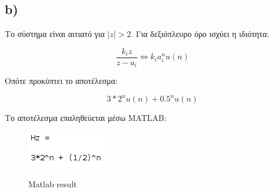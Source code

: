 \documentclass[11pt]{article}
\begin{document}
\subsection*{b)}
Το σύστημα είναι αιτιατό για $|z| > 2$.
Για δεξιόπλευρο όρο ισχύει η ιδιότητα:

\[
       \frac{k_i z}{z-a_i} \Leftrightarrow k_i a_i^n u(n)
\] 

\par \noindent
Οπότε προκύπτει το αποτέλεσμα:

\[
    3 * 2^n u(n) + 0.5^n u(n)
\] 

\par \noindent
Το αποτέλεσμα επαληθεύεται μέσω MATLAB:

\begin{figure}[H]
    \centering
    \includegraphics[scale=0.7]{photos/H_z.png} \\
    \caption{Matlab result }
\end{figure}
\end{document}
